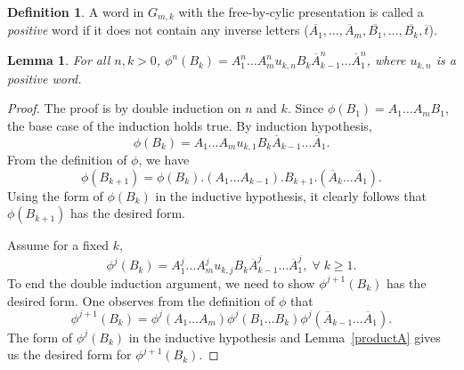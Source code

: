 \documentclass[oneside,11pt,reqno]{amsart}
\newtheorem{lem}[thm]{Lemma}
\theoremstyle{definition}
\newtheorem{defn}[thm]{Definition}
\newtheorem{rem}[thm]{Remark}
\begin{document}
\begin{defn}
A word in $G_{m,k}$ with the free-by-cylic presentation is called a \emph{positive} word if it does not contain any inverse letters ($\overline{A_1}, \ldots, \overline{A}_m,  \overline{B_1}, \ldots, \overline{B_k}, \overline{t}$).
\end{defn}


\begin{lem}\label{linear}
For all $n , k > 0$, $\phi^n(B_k) = A_1^n \ldots A_m^n u_{k,n}B_k\overline{A}^{n}_{k-1} \ldots \overline{A}^{n}_1$, where $u_{k,n}$ is a positive word.
\end{lem}

\begin{proof}
The proof is by double induction on $n$ and $k$. Since $\phi (B_1) = A_1 \ldots A_m B_1$, the base case of the induction holds true. By induction hypothesis, $$\phi(B_k) = A_1 \ldots A_m u_{k,1}B_k \overline{A}_{k-1} \ldots \overline{A}_1.$$  
From the definition of $\phi$,  we have $$\phi(B_{k+1}) = \phi (B_k) . (A_1 \ldots A_{k-1}). B_{k+1} . (\overline{A}_k \ldots \overline{A}_1).$$ 
Using the form of $\phi(B_k)$ in the inductive hypothesis, it clearly follows that $\phi(B_{k+1})$ has the desired form.

Assume for a fixed $k$,
$$\phi^j(B_k) = A_1^j \ldots A_m^j u_{k,j}B_k\overline{A}^{j}_{k-1} \ldots \overline{A}^{j}_1, \;  \forall \; k \geq 1.$$
To end the double induction argument, we need to show $\phi^{j+1} (B_k)$ has the desired form. One observes from the definition of $\phi$ that $$\phi^{j+1} (B_k) = \phi^j (A_1 \ldots A_m) \phi^j (B_1 \ldots B_k) \phi^j (\overline{A}_{k-1} \ldots \overline{A}_1).$$
The form of $\phi^j(B_k)$ in the inductive hypothesis and Lemma~\ref{productA} gives us the desired form for $\phi^{j+1} (B_{k}).$







\end{proof}
\end{document}
